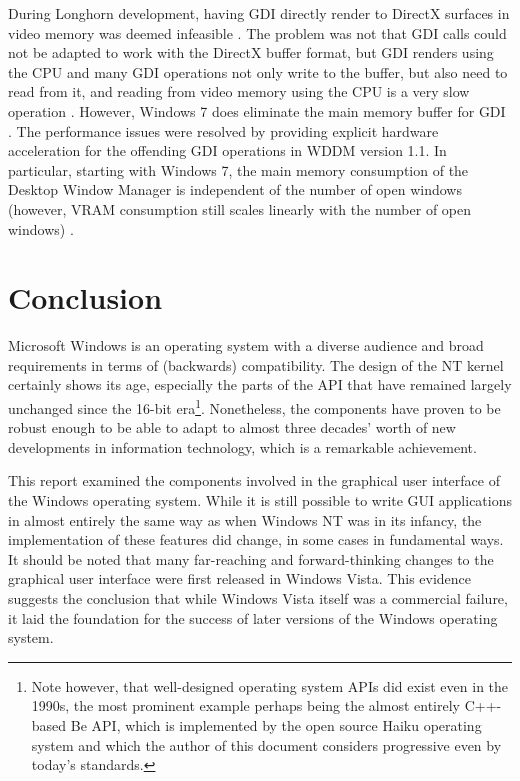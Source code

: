 			During Longhorn development, having GDI directly render to DirectX
			surfaces in video memory was deemed infeasible \cite{dwmredirect}. The problem
			was not that GDI calls
			could not be adapted to work with the DirectX buffer format, but
			GDI renders using the CPU and many GDI operations not only write to
			the buffer, but also need to read from it, and reading from video memory
			using the CPU is a very slow operation \cite{dwmredirect}. However,
			Windows 7 does eliminate the main memory buffer for GDI \cite{win7}. The performance
			issues were resolved by providing explicit hardware acceleration for
			the offending GDI operations in WDDM version 1.1. In particular,
			starting with Windows 7, the
			main memory consumption of the Desktop Window Manager is independent
			of the number of open windows (however, VRAM consumption still scales
			linearly with the number of open windows) \cite{win7}.

	\section{Conclusion}
		Microsoft Windows is an operating system with a diverse audience and
		broad requirements in terms of (backwards) compatibility. The design
		of the NT kernel certainly shows its age, especially the parts of the API
		that have remained largely unchanged since the 16-bit era\footnote{Note however,
		that well-designed operating system APIs did exist even in the 1990s, the
		most prominent example perhaps being the almost entirely C++-based Be API,
		which is implemented by the open source Haiku operating system
		\cite{haikuapi} and which the author of this document considers
		progressive even by today's standards.}. Nonetheless, the components have
		proven to be robust enough to be able to adapt to almost three decades'
		worth of new developments in information technology, which is a remarkable
		achievement.

		This report examined the components involved in the graphical user
		interface of the Windows operating system. While it is still possible
		to write GUI applications in almost entirely the same way as when Windows NT
		was in its infancy, the implementation of these features did change, in
		some cases in fundamental ways. It should be noted that many far-reaching
		and forward-thinking
		changes to the graphical user interface were first released in Windows
		Vista. This evidence suggests the conclusion that while Windows Vista itself
		was a commercial failure, it laid the foundation for the success of later
		versions of the Windows operating system.


	\onecolumn{\printbibliography}

